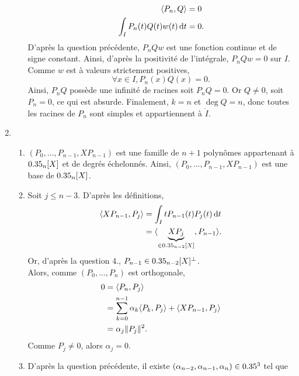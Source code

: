 \begin{solution}
\begin{enumerate}
\begin{enumerate}
            \begin{align*}
                \langle P_n, Q \rangle &= 0 \\
                \int_I P_n(t) Q(t) w(t) \, \mathrm{d} t &= 0.
            \end{align*}
            D'après la question précédente, $P_n Q w$ est une fonction continue et de signe constant. Ainsi, d'après la positivité de l'intégrale, $P_n Q w = 0$ sur $I$. Comme $w$ est à valeurs strictement positives,
            $$\forall x \in I, P_n(x) Q(x) = 0.$$
            Ainsi, $P_n Q$ possède une infinité de racines soit $P_n Q = 0$. Or $Q \not= 0$, soit $P_n = 0$, ce qui est absurde. Finalement, $k=n$ \note {} et $\deg Q = n$, donc toutes les racines de $P_n$ sont simples et appartiennent à $\mathring{I}$. 
        \end{enumerate}
        \item 
        \begin{enumerate}
            \item $(P_0, \dots, P_{n-1}, X P_{n-1})$ est une famille de $n+1$ polynômes appartenant à $0.35_n[X]$ et de degrés échelonnés. Ainsi, $(P_0, \dots, P_{n-1}, X P_{n-1})$ est une base de $0.35_n[X]$.
            \item Soit $j \leqslant n-3$. D'après les définitions,
            \begin{align*}
                \langle X P_{n-1}, P_j \rangle &= \int_I t P_{n-1}(t) P_j(t) \, \mathrm{d} t \\
                &= \langle \underbrace{X P_j}_{\in 0.35_{n-2}[X]}, P_{n-1} \rangle.
            \end{align*}
            Or, d'après la question $4.$, $P_{n-1} \in 0.35_{n-2}[X]^\perp$. \\
            Alors, comme $(P_0, \dots, P_n)$ est orthogonale,
            \begin{align*}
                0 &= \langle P_n, P_j \rangle \\
                &= \sum_{k=0}^{n-1} \alpha_k \langle P_k, P_j \rangle + \langle X P_{n-1}, P_j \rangle \\
                &= \alpha_j \Vert P_j \Vert^2.
            \end{align*}
            Comme $P_j \not= 0$, alors $\alpha_j = 0$.
            \item D'après la question précédente, il existe $(\alpha_{n-2}, \alpha_{n-1}, \alpha_n) \in 0.35^3$ tel que 

\end{enumerate}
\end{enumerate}
\end{solution}
